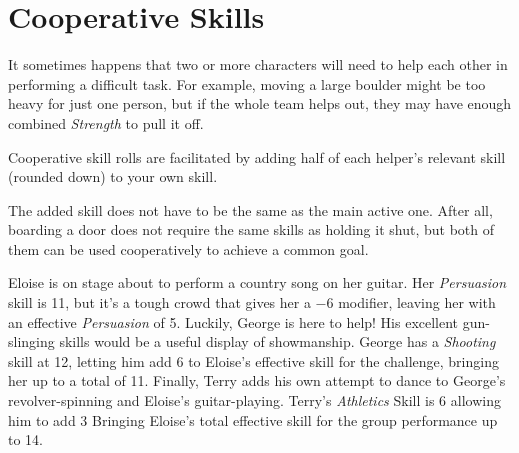 \section{Cooperative Skills}
It sometimes happens that two or more characters will need to help each other in performing a difficult task.
For example, moving a large boulder might be too heavy for just one person, but if the whole team helps out, they may have enough combined \textit{Strength} to pull it off.

Cooperative skill rolls are facilitated by adding half of each helper's relevant skill (rounded down) to your own skill.

\begin{note} 
    The added skill does not have to be the same as the main active one. 
    After all, boarding a door does not require the same skills as holding it shut, but both of them can be used cooperatively to achieve a common goal.
\end{note}

\begin{example}
    Eloise is on stage about to perform a country song on her guitar.
    Her \textit{Persuasion} skill is 11, but it's a tough crowd that gives her a $-6$ modifier, leaving her with an effective \textit{Persuasion} of 5.
    Luckily, George is here to help!
    His excellent gun-slinging skills would be a useful display of showmanship.
    George has a \textit{Shooting} skill at 12, letting him add 6 to Eloise's effective skill for the challenge, bringing her up to a total of 11.
    Finally, Terry adds his own attempt to dance to George's revolver-spinning and Eloise's guitar-playing. 
    Terry's \textit{Athletics} Skill is 6 allowing him to add 3 Bringing Eloise's total effective skill for the group performance up to 14.
\end{example}